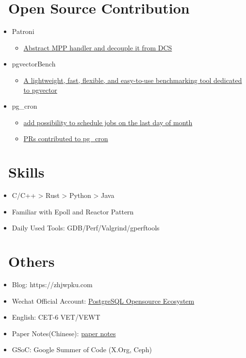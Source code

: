 \documentclass{resume}
\begin{document}
\section{\faCodeFork\ Open Source Contribution}
\begin{onehalfspacing}
  \begin{itemize}
    \item Patroni
      \begin{itemize}
        \item \href{https://github.com/zalando/patroni/pull/2960}{Abstract MPP handler and decouple it from DCS}
      \end{itemize}
    \item pgvectorBench
      \begin{itemize}
        \item \href{https://github.com/zhjwpku/pgvectorBench}{A lightweight, fast, flexible, and easy-to-use benchmarking tool dedicated to pgvector}
      \end{itemize}
    \item pg\_cron
      \begin{itemize}
        \item \href{https://github.com/citusdata/pg_cron/pull/273}{add possibility to schedule jobs on the last day of month}
        \item \href{https://github.com/citusdata/pg_cron/pulls?q=is%3Apr+author%3A%40me+}{PRs contributed to pg\_cron}
      \end{itemize}
  \end{itemize}
  \end{onehalfspacing}

\section{\faWrench\ Skills}
\begin{itemize}[parsep=0.5ex]
  \item C/C++ > Rust > Python > Java
  \item Familiar with Epoll and Reactor Pattern
  \item Daily Used Tools: GDB/Perf/Valgrind/gperftools
\end{itemize}

\section{\faCogs\ Others}
\begin{itemize}[parsep=0.5ex]
  \item Blog: https://zhjwpku.com
  \item Wechat Official Account: \href{https://pg-x.github.io/images/wechat_qrcode.jpg}{PostgreSQL Opensource Ecosystem}
  \item English: CET-6 VET/VEWT
  \item Paper Notes(Chinese): \href{https://paper-notes.zhjwpku.com/}{paper notes}
  \item GSoC: Google Summer of Code (X.Org, Ceph)
\end{itemize}
\end{document}
